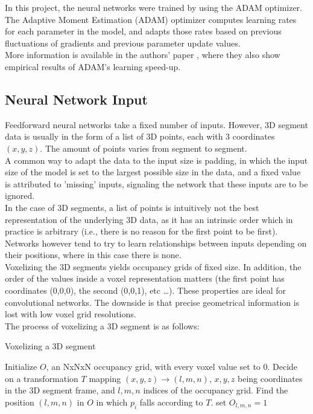 In this project, the neural networks were trained by using the ADAM optimizer. The Adaptive Moment Estimation (ADAM) optimizer computes learning rates for each parameter in the model, and adapts those rates based on previous fluctuations of gradients and previous parameter update values.\\

More information is available in the authors' paper \cite{adam}, where they also show empirical results of ADAM's learning speed-up. 

\subsection{Neural Network Input}
\label{subsec:NNinput}

Feedforward neural networks take a fixed number of inputs. However, 3D segment data is usually in the form of a list of 3D points, each with 3 coordinates $(x,y,z)$. The amount of points varies from segment to segment.\\

A common way to adapt the data to the input size is padding, in which the input size of the model is set to the largest possible size in the data, and a fixed value is attributed to 'missing' inputs, signaling the network that these inputs are to be ignored.\\

In the case of 3D segments, a list of points is intuitively not the best representation of the underlying 3D data, as it has an intrinsic order which in practice is arbitrary (i.e., there is no reason for the first point to be first). Networks however tend to try to learn relationships between inputs depending on their positions, where in this case there is none.\\

Voxelizing the 3D segments yields occupancy grids of fixed size. In addition, the order of the values inside a voxel representation matters (the first point has coordinates (0,0,0), the second (0,0,1), etc \ldots). These properties are ideal for convolutional networks. The downside is that precise geometrical information is lost with low voxel grid resolutions.\\

The process of voxelizing a 3D segment is as follows:

\begin{algorithm}
  \caption{Voxelizing a 3D segment}
  \begin{algorithmic}[1]
    \State Initialize $O$, an NxNxN occupancy grid, with every voxel value set to 0.
    \State Decide on a transformation $T$ mapping $(x,y,z) \to (l,m,n)$, $x,y,z$ being coordinates in the 3D segment frame, and $l,m,n$ indices of the occupancy grid.
    \State Find the position $(l,m,n)$ in $O$ in which $p_i$ falls according to $T$.
     \State set $O_{l,m,n} = 1$
    \EndIf
    \EndFor
  \end{algorithmic}
\end{algorithm}

